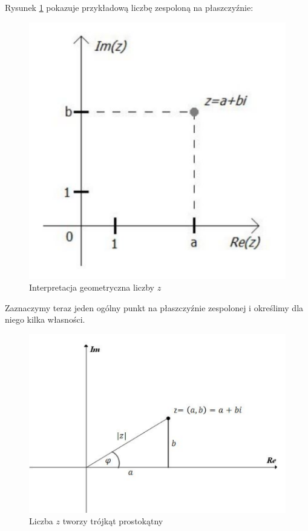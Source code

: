 \documentclass[a4paper,12pt]{article}
\begin{document}
Rysunek \ref{fig:liczba3} pokazuje przykładową liczbę zespoloną na płaszczyźnie:

\begin{figure}[ht]
\centering
\includegraphics[scale=0.4]{liczba_zespolona3.pdf}
\caption{Interpretacja geometryczna liczby $z$}
\label{fig:liczba3}
\end{figure}

Zaznaczymy teraz jeden ogólny punkt na płaszczyźnie zespolonej i określimy dla niego kilka własności.

\begin{figure}[h]
\centering
\includegraphics[scale=0.6]{liczba_zespolona4.pdf}
\caption{Liczba $z$ tworzy trójkąt prostokątny}
\label{fig:liczba4}
\end{figure}
\end{document}
